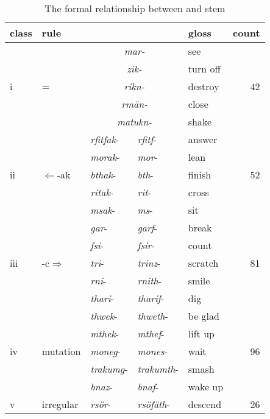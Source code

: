 \begin{table}
\caption{The formal relationship between \Ext{} and \Rs{} stem}
\label{frbearr}
\begin{tabularx}{\textwidth}{lXllXr}
	\lsptoprule
	{class}&{rule} &\Ext{} &\Rs{} &{gloss} &{count}\\\midrule
	\multirow{5}{*}{{i}}	&\multirow{5}{*}{\Ext{}=\Rs{}} &\multicolumn{2}{c}{\emph{mar-}} &see &\multirow{5}{*}{\textsc{42}}\\
	&&\multicolumn{2}{c}{\emph{zik-}} &turn off &\\
	&&\multicolumn{2}{c}{\emph{rikn-}} &destroy &\\
	&&\multicolumn{2}{c}{\emph{rmän-}} &close &\\
	&&\multicolumn{2}{c}{\emph{matukn-}} &shake &\\\midrule
	\multirow{5}{*}{{ii}} &\multirow{5}{*}{\Ext{}$\Leftarrow$\Rs-ak} &\emph{rfitfak}- &\emph{rfitf}- &answer &\multirow{5}{*}{\textsc{52}}\\
	&&\emph{morak}- &\emph{mor}- &lean &\\
	&&\emph{bthak}- &\emph{bth}- &finish &\\
	&&\emph{ritak}-	&\emph{rit}- &cross &\\
	&&\emph{msak}- &\emph{ms}-	&sit &\\\midrule
	\multirow{5}{*}{{iii}} &\multirow{5}{*}{\Ext-{c}$\Rightarrow$\Rs} &\emph{gar}- &\emph{garf}- &break &\multirow{5}{*}{\textsc{81}}\\
	&&\emph{fsi}- &\emph{fsir}- &count &\\
	&&\emph{tri}- &\emph{trinz}- &scratch &\\
	&&\emph{rni}- &\emph{rnith}- &smile &\\
	&&\emph{thari}- &\emph{tharif}-	&dig &\\\midrule
	\multirow{5}{*}{{iv}} &\multirow{5}{*}{{mutation}} &\emph{thwek}- &\emph{thweth}- &be glad &\multirow{5}{*}{\textsc{96}}\\
	&&\emph{mthek}- &\emph{mthef}- &lift up &\\
	&&\emph{moneg}-	&\emph{mones}- &wait &\\
	&&\emph{trakumg}- &\emph{trakumth}- &smash &\\
	&&\emph{bnaz}- &\emph{bnaf}- &wake up\\\midrule
	\multirow{5}{*}{{v}}	&\multirow{5}{*}{{irregular}} &\emph{rsör}- &\emph{rsöfäth}- & descend &\multirow{5}{*}{\textsc{26}}\\

\end{tabularx}
\end{table}
